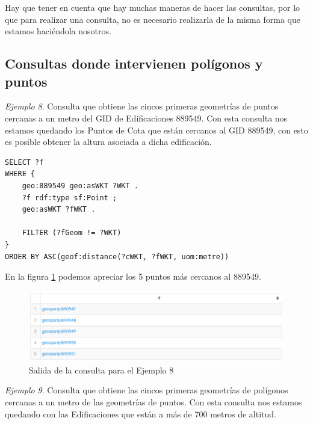 Hay que tener en cuenta que hay muchas maneras de hacer las consultas, por lo que para realizar una consulta, no es necesario realizarla de la misma forma que estamos haciéndola nosotros.






\subsection{Consultas donde intervienen polígonos y puntos}

\textit{Ejemplo 8}. Consulta que obtiene las cincos primeras geometrías de puntos cercanas a un metro del GID de Edificaciones 889549. Con esta consulta nos estamos quedando los Puntos de Cota que están cercanos al GID 889549, con esto es posible obtener la altura asociada a dicha edificación.

\vspace*{0.2cm}

\begin{lstlisting}
SELECT ?f
WHERE {
	geo:889549 geo:asWKT ?WKT .
	?f rdf:type sf:Point ;
	geo:asWKT ?fWKT .
	
	FILTER (?fGeom != ?WKT)
}
ORDER BY ASC(geof:distance(?cWKT, ?fWKT, uom:metre))
\end{lstlisting}

En la figura \ref{fig:salida9} podemos apreciar los 5 puntos más cercanos al 889549.

\begin{figure}[H]
	\centering
	\includegraphics[width=1\linewidth]{imagenes/capitulo5/salida9}
	\caption{Salida de la consulta para el Ejemplo 8}
	\label{fig:salida9}
\end{figure}


\textit{Ejemplo 9}. Consulta que obtiene las cincos primeras geometrías de polígonos cercanas a un metro de las geometrías de puntos. Con esta consulta nos estamos quedando con las Edificaciones que están a más de 700 metros de altitud.

\vspace*{0.2cm}

